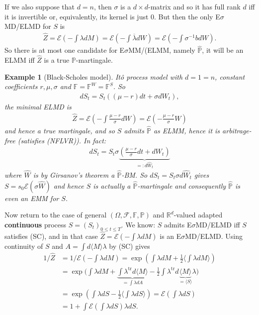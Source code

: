 \documentclass[12pt,a4paper, twoside]{article}
\newtheorem{exmp}{Example}[section]
\theoremstyle{definition}
\newcommand{\PP}{\mathbb{P}} %
\begin{document}
If we also suppose that $d=n$, then $\sigma$ is a $d \times d$-matrix and so it has full rank $d$ iff it is invertible or, equivalently, its kernel is just $0$. But then the only E$\sigma$MD/ELMD for $S$ is 
\begin{align*}
\hat{Z}= \mathcal{E} \left( - \int \lambda dM \right) = \mathcal{E}\left( - \int \overline{\lambda}dW \right) = \mathcal{E} \left( - \int \sigma^{-1} b dW \right). 
\end{align*}
So there is at most one candidate for E$\sigma$MM/(ELMM, namely $\hat{\PP}$, it will be an ELMM iff $\hat{Z}$ is a true $\PP$-martingale. 
\begin{exmp}[Black-Scholes model] Itô process model with $d=1=n$, constant coefficients $r, \mu, \sigma$ and $\mathbb{F}= \mathbb{F}^W= \mathbb{F}^S$. So 
\begin{align*}
dS_t = S_t(( \mu-r)dt + \sigma dW_t),
\end{align*}
the minimal ELMD is \begin{align*}
\hat{Z}= \mathcal{E}\left( - \int \frac{\mu-r}{\sigma}dW \right) = \mathcal{E} \left( - \frac{\mu-r}{\sigma}W \right)
\end{align*}
and hence a true martingale, and so $S$ admits $\hat{\PP}$ as ELMM, hence it is arbitrage-free (satisfies (NFLVR)). In fact: 
\begin{align*}
dS_t = S_t \sigma \underbrace{\left( \frac{\mu-r}{\sigma}dt + dW_t \right)}_{=: d \widehat{W}_t}
\end{align*}
where $\widehat{W}$ is by Girsanov's theorem a $\hat{\PP}$-BM. So $dS_t= S_t \sigma d\widehat{W}_t$ gives $S= s_0 \mathcal{E}( \sigma \widehat{W})$ and hence $S$ is actually a $\hat{\PP}$-martingale and consequently $\hat{\PP}$ is even an EMM for $S$. 
\end{exmp}
\newpage
Now return to the case of general $( \Omega, \mathcal{F}, \mathbb{F}, \PP)$ and $\mathbb{R}^d$-valued adapted \textbf{continuous} process $S=(S_t)_{0 \leq t \leq T}$. We know: $S$ admits E$\sigma$MD/ELMD iff $S$ satisfies (SC), and in that case $\hat{Z}= \mathcal{E}( - \int \lambda dM)$ is an E$\sigma$MD/ELMD. Using continuity of $S$ and $A= \int d \langle M \rangle \lambda$ by (SC) gives 
\begin{align*}
1/ \hat{Z}&= 1/ \mathcal{E} \left( - \int \lambda dM \right) = \exp \left( \int \lambda dM + \frac{1}{2} \langle \int \lambda dM \rangle \right) \\
&= \exp \Big( \int \lambda dM + \underbrace{\int \lambda^\text{tr}d \langle M \rangle}_{= \int \lambda dA} - \frac{1}{2} \int \lambda^\text{tr} d \underbrace{\langle M \rangle}_{= \langle S \rangle} \lambda \Big) \\
& =\exp \left( \int \lambda dS - \frac{1}{2} \langle \int \lambda dS \rangle \right) = \mathcal{E}\left( \int \lambda dS \right) \\
&= 1 + \int \mathcal{E} \left( \int \lambda dS \right) \lambda dS.
\end{align*}
\end{document}

